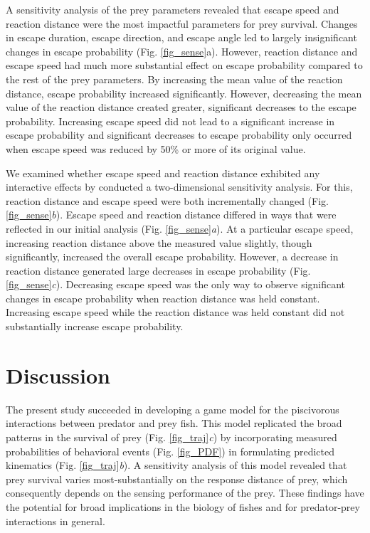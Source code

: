 \documentclass[]{rsos}%
\begin{document}
A sensitivity analysis of the prey parameters revealed that escape speed and reaction distance were the most impactful parameters for prey survival. 
Changes in escape duration, escape direction, and escape angle led to largely insignificant changes in escape probability (Fig. \ref{fig_sense}a). 
However, reaction distance and escape speed had much more substantial effect on escape probability compared to the rest of the prey parameters. 
By increasing the mean value of the reaction distance, escape probability increased significantly. 
However, decreasing the mean value of the reaction distance created greater, significant decreases to the escape probability. 
Increasing escape speed did not lead to a significant increase in escape probability and significant decreases to escape probability only occurred when escape speed was reduced by 50\% or more of its original value.

We examined whether escape speed and reaction distance exhibited any interactive effects by conducted a two-dimensional sensitivity analysis.
For this, reaction distance and escape speed were both incrementally changed (Fig. \ref{fig_sense}\textit{b}). 
Escape speed and reaction distance differed in ways that were reflected in our initial analysis (Fig. \ref{fig_sense}\textit{a}). 
At a particular escape speed, increasing reaction distance above the measured value slightly, though significantly, increased the overall escape probability. 
However, a decrease in reaction distance generated large decreases in escape probability (Fig. \ref{fig_sense}\textit{c}). 
Decreasing escape speed was the only way to observe significant changes in escape probability when reaction distance was held constant.
  Increasing escape speed while the reaction distance was held constant did not substantially increase escape probability. 



\section{Discussion} %

The present study succeeded in developing a game model for the piscivorous interactions between predator and prey fish. 
This model replicated the broad patterns in the survival of prey (Fig. \ref{fig_traj}\textit{c}) by incorporating measured probabilities of behavioral events (Fig. \ref{fig_PDF}) in formulating predicted kinematics (Fig. \ref{fig_traj}\textit{b}).
A sensitivity analysis of this model revealed that prey survival varies most-substantially on the response distance of prey, which consequently depends on the sensing performance of the prey.
These findings have the potential for broad implications in the biology of fishes and for predator-prey interactions in general.
\end{document}
